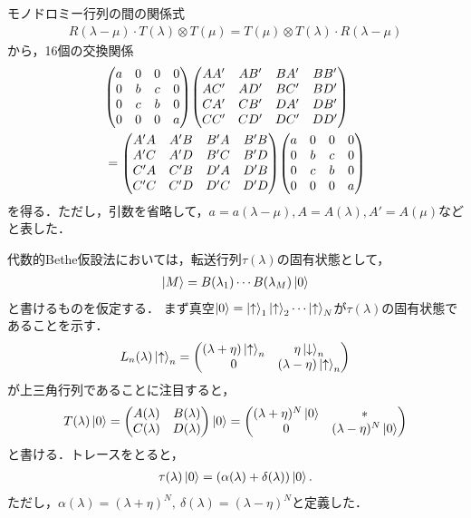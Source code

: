 \documentclass[dvipdfmx,9pt]{beamer}
\numberwithin{equation}{section}
\begin{document}
\begin{frame}{}
    モノドロミー行列の間の関係式
    \begin{align}
        R(\lambda - \mu) \cdot T(\lambda)\otimes T(\mu)
        = T(\mu) \otimes T(\lambda) \cdot R(\lambda-\mu)
    \end{align}
    から，16個の交換関係
    \begin{align}
        &\nonumber
         \mqty(
            a&0&0&0\\
            0&b&c&0\\
            0&c&b&0\\
            0&0&0&a
        ) \mqty
        (
            AA'&AB'&BA'&BB'\\
            AC'&AD'&BC'&BD'\\
            CA'&CB'&DA'&DB'\\
            CC'&CD'&DC'&DD'
        )
        \\ &
        = \mqty
        (
            A'A&A'B&B'A&B'B\\
            A'C&A'D&B'C&B'D\\
            C'A&C'B&D'A&D'B\\
            C'C&C'D&D'C&D'D
        ) \mqty(
            a&0&0&0\\
            0&b&c&0\\
            0&c&b&0\\
            0&0&0&a
        )
    \end{align}
    を得る．ただし，引数を省略して，$a = a(\lambda-\mu), A = A(\lambda), A' = A(\mu)$などと表した．
\end{frame}

\begin{frame}{}
    代数的Bethe仮設法においては，転送行列$\tau(\lambda)$の固有状態として，
    \begin{align}
        \ket{M} = B(\lambda_1)\cdots B(\lambda_M)\ket{0}
    \end{align}
    と書けるものを仮定する．
    まず真空$\ket{0} = \ket{\uparrow}_1 \ket{\uparrow}_2 \cdots \ket{\uparrow}_N$が$\tau(\lambda)$の固有状態であることを示す．
    \begin{align}
        L_n(\lambda)\ket{\uparrow}_n
        = \mqty(
            (\lambda+\eta)\ket{\uparrow}_n& \eta\ket{\downarrow}_n\\
            0&(\lambda-\eta)\ket{\uparrow}_n
            )
    \end{align}
    が上三角行列であることに注目すると，
    \begin{align}
        T(\lambda)\ket{0} = \mqty(A(\lambda)&B(\lambda)\\C(\lambda)&D(\lambda))\ket{0}
        = \mqty((\lambda+\eta)^N\ket{0}& * \\ 0 & (\lambda-\eta)^N\ket{0})
    \end{align}
    と書ける．トレースをとると，
    \begin{align}
        \tau(\lambda)\ket{0} = (\alpha(\lambda) + \delta(\lambda))\ket{0}.
    \end{align}
    ただし，$\alpha(\lambda) = (\lambda+\eta)^N,~ \delta(\lambda) = (\lambda-\eta)^N$と定義した．
\end{frame}
\end{document}
